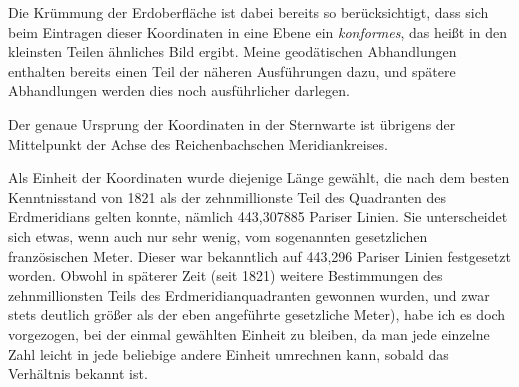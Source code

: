 Die Krümmung der Erdoberfläche ist dabei bereits so berücksichtigt, dass sich beim Eintragen dieser Koordinaten in eine Ebene ein \textit{konformes}, das heißt in den kleinsten Teilen ähnliches Bild ergibt. Meine geodätischen Abhandlungen enthalten bereits einen Teil der näheren Ausführungen dazu, und spätere Abhandlungen werden dies noch ausführlicher darlegen.

Der genaue Ursprung der Koordinaten in der Sternwarte ist übrigens der Mittelpunkt der Achse des Reichenbachschen Meridiankreises.

Als Einheit der Koordinaten wurde diejenige Länge gewählt, die nach dem besten Kenntnisstand von 1821 als der zehnmillionste Teil des Quadranten des Erdmeridians gelten konnte, nämlich 443,307885 Pariser Linien. Sie unterscheidet sich etwas, wenn auch nur sehr wenig, vom sogenannten gesetzlichen französischen Meter. Dieser war bekanntlich auf 443,296 Pariser Linien festgesetzt worden. Obwohl in späterer Zeit (seit 1821) weitere Bestimmungen des zehnmillionsten Teils des Erdmeridianquadranten gewonnen wurden, und zwar stets deutlich größer als der eben angeführte gesetzliche Meter), habe ich es doch vorgezogen, bei der einmal gewählten Einheit zu bleiben, da man jede einzelne Zahl leicht in jede beliebige andere Einheit umrechnen kann, sobald das Verhältnis bekannt ist.

